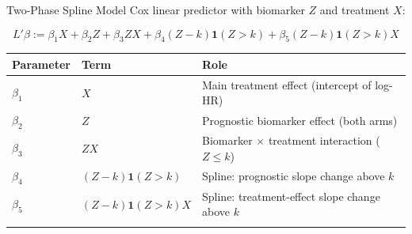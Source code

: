 \documentclass[
  ignorenonframetext,
  aspectratio=169]{beamer}
\begin{document}
\begin{frame}[shrink]{Two-Phase Spline Model}
\label{two-phase-spline-model}
Cox linear predictor with biomarker \(Z\) and treatment \(X\):

\[L'\beta := \beta_{1} X + \beta_{2} Z + \beta_{3} ZX + \beta_{4}(Z-k)\mathbf{1}(Z>k) + \beta_{5}(Z-k)\mathbf{1}(Z>k)X\]

\small

\begin{longtable}[]{@{}
  >{\centering\arraybackslash}p{}
  >{\raggedright\arraybackslash}p{}
  >{\raggedright\arraybackslash}p{}@{}}
\toprule\noalign{}
\begin{minipage}[b]{\linewidth}\centering
Parameter
\end{minipage} & \begin{minipage}[b]{\linewidth}\raggedright
Term
\end{minipage} & \begin{minipage}[b]{\linewidth}\raggedright
Role
\end{minipage} \\
\midrule\noalign{}
\endhead
\(\beta_{1}\) & \(X\) & Main treatment effect (intercept of log-HR) \\
\(\beta_{2}\) & \(Z\) & Prognostic biomarker effect (both arms) \\
\(\beta_{3}\) & \(ZX\) & Biomarker \(\times\) treatment interaction
(\(Z \leq k\)) \\
\(\beta_{4}\) & \((Z{-}k)\mathbf{1}(Z{>}k)\) & Spline: prognostic slope
change above \(k\) \\
\(\beta_{5}\) & \((Z{-}k)\mathbf{1}(Z{>}k)X\) & Spline: treatment-effect
slope change above \(k\) \\
\bottomrule\noalign{}
\end{longtable}

\normalsize
\end{frame}
\end{document}
